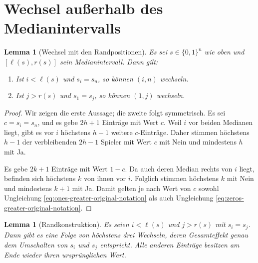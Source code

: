 \documentclass[12pt]{article}
\newtheorem{lem}[thm]{Lemma}
\begin{document}
\section{Wechsel außerhalb des Medianintervalls}

\begin{lem}[Wechsel mit den Randpositionen]
Es sei $s\in\{0,1\}^n$ wie oben und $[\ell(s),r(s)]$ sein Medianintervall.
Dann gilt:
\begin{enumerate}
\item Ist $i<\ell(s)$ und $s_i=s_n$, so können $(i,n)$ wechseln.
\item Ist $j>r(s)$ und $s_1=s_j$, so können $(1,j)$ wechseln.
\end{enumerate}
\label{lem:wechsel-mit-rand}
\end{lem}

\begin{proof}
Wir zeigen die erste Aussage; die zweite folgt symmetrisch. Es sei
$c=s_i=s_n$, und es gebe $2h+1$ Einträge mit Wert $c$. Weil $i$ vor beiden
Medianen liegt, gibt es vor $i$ höchstens $h-1$ weitere $c$-Einträge. Daher
stimmen höchstens $h-1$ der verbleibenden $2h-1$ Spieler mit Wert $c$ mit
Nein und mindestens $h$ mit Ja.

Es gebe $2k+1$ Einträge mit Wert $1-c$. Da auch deren Median rechts von $i$
liegt, befinden sich höchstens $k$ von ihnen vor $i$. Folglich stimmen
höchstens $k$ mit Nein und mindestens $k+1$ mit Ja. Damit gelten je nach Wert
von $c$ sowohl Ungleichung
\eqref{eq:ones-greater-original-notation} als auch Ungleichung
\eqref{eq:zeros-greater-original-notation}.
\end{proof}

\begin{lem}[Randkonstruktion]
Es seien $i<\ell(s)$ und $j>r(s)$ mit $s_i=s_j$. Dann gibt es eine Folge von
höchstens drei Wechseln, deren Gesamteffekt genau dem Umschalten von $s_i$ und
$s_j$ entspricht. Alle anderen Einträge besitzen am Ende wieder ihren
ursprünglichen Wert.
\label{lem:randkonstruktion-original}
\end{lem}
\end{document}
